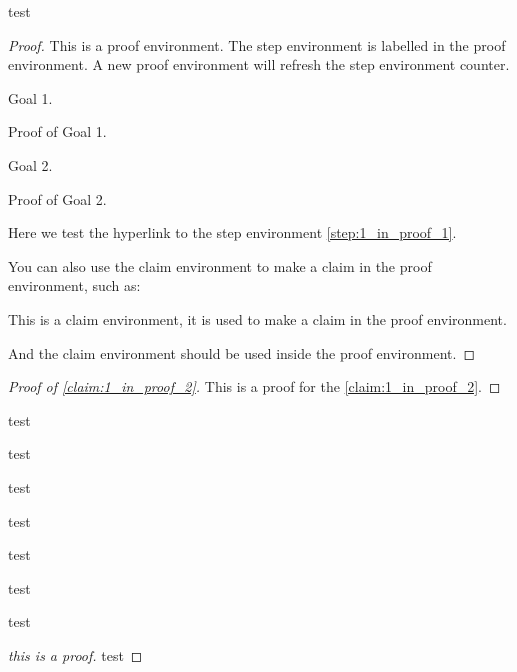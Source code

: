     \begin{theorem}
        test 
    \end{theorem}
    \begin{proof}
        This is a proof environment.
        The step environment is labelled in the proof environment.
        A new proof environment will refresh the step environment counter.
        \begin{step}\label{step:1_in_proof_2}
            Goal 1.
        \end{step}
        Proof of Goal 1.
        
        \begin{step}\label{step:2_in_proof_2}
            Goal 2.
        \end{step}
        Proof of Goal 2.

        Here we test the hyperlink to the step environment \cref{step:1_in_proof_1}.

        You can also use the claim environment to make a claim in the proof environment, such as:
        \begin{claim}\label{claim:1_in_proof_2}
            This is a claim environment, it is used to make a claim in the proof environment.
        \end{claim}
        And the claim environment should be used inside the proof environment.
    \end{proof}
    \begin{proof}[Proof of \cref{claim:1_in_proof_2}]
        This is a proof for the \cref{claim:1_in_proof_2}.
    \end{proof}

    \begin{lemma}
        test
    \end{lemma}
    \begin{corollary}
        test 
    \end{corollary}
    \begin{question}
        test
    \end{question}
    \begin{conjecture}
        test
    \end{conjecture}

    \begin{example}
        test 
    \end{example}
    \begin{exercise}
        test
    \end{exercise}
    \begin{remark}
        test
    \end{remark}
    \begin{proof}[this is a proof]
        test
    \end{proof}


